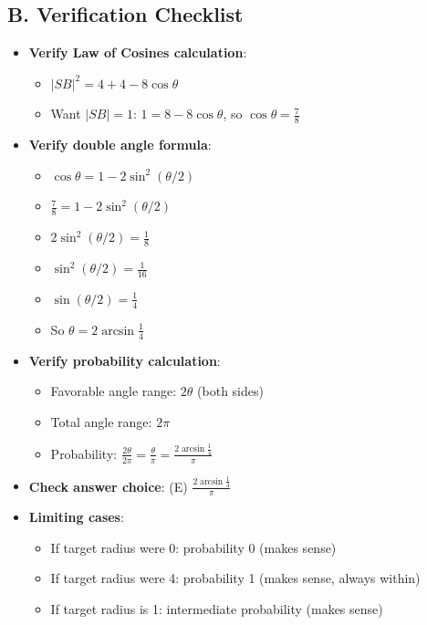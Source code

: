 \documentclass[12pt]{article}
\begin{document}
\begin{verificationbox}
\subsection*{B. Verification Checklist}
\begin{itemize}[leftmargin=*]
    \item \textbf{Verify Law of Cosines calculation}:
    \begin{itemize}
        \item $|SB|^2 = 4 + 4 - 8\cos\theta$ \checkmark
        \item Want $|SB| = 1$: $1 = 8 - 8\cos\theta$, so $\cos\theta = \frac{7}{8}$ \checkmark
    \end{itemize}
    \item \textbf{Verify double angle formula}:
    \begin{itemize}
        \item $\cos\theta = 1 - 2\sin^2(\theta/2)$
        \item $\frac{7}{8} = 1 - 2\sin^2(\theta/2)$
        \item $2\sin^2(\theta/2) = \frac{1}{8}$
        \item $\sin^2(\theta/2) = \frac{1}{16}$
        \item $\sin(\theta/2) = \frac{1}{4}$ \checkmark
        \item So $\theta = 2\arcsin\frac{1}{4}$ \checkmark
    \end{itemize}
    \item \textbf{Verify probability calculation}:
    \begin{itemize}
        \item Favorable angle range: $2\theta$ (both sides)
        \item Total angle range: $2\pi$
        \item Probability: $\frac{2\theta}{2\pi} = \frac{\theta}{\pi} = \frac{2\arcsin\frac{1}{4}}{\pi}$ \checkmark
    \end{itemize}
    \item \textbf{Check answer choice}: (E) $\frac{2\arcsin\frac{1}{4}}{\pi}$ \checkmark
    \item \textbf{Limiting cases}:
    \begin{itemize}
        \item If target radius were 0: probability 0 (makes sense)
        \item If target radius were 4: probability 1 (makes sense, always within)
        \item If target radius is 1: intermediate probability (makes sense)
    \end{itemize}
\end{itemize}


\end{verificationbox}
\end{document}
